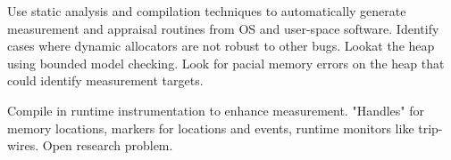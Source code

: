 \documentclass[runningheads]{llncs}
\begin{document}
Use static analysis and compilation techniques to automatically
generate measurement and appraisal routines from OS and user-space
software. Identify cases where dynamic allocators are not robust to
other bugs. Lookat the heap using bounded model checking.  Look for
pacial memory errors on the heap that could identify measurement
targets.

Compile in runtime instrumentation to enhance measurement.  "Handles"
for memory locations, markers for locations and events, runtime
monitors like trip-wires.  Open research problem.


% 
% 
%
%
%


%
%
\end{document}
